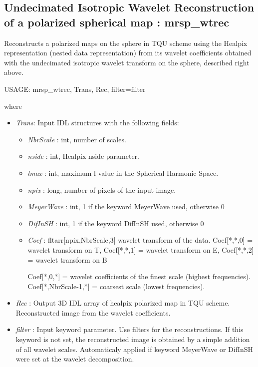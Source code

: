 \subsection{Undecimated Isotropic Wavelet Reconstruction of a polarized spherical map : mrsp\_wtrec}
Reconstructs a polarized maps on the sphere in TQU scheme using the Healpix representation (nested data representation) 
from its wavelet coefficients obtained with the undecimated isotropic wavelet transform on the sphere, described right above.
{\bf
\begin{center}
     USAGE: mrsp\_wtrec, Trans, Rec, filter=filter
\end{center}}
where
\begin{itemize}
\item {\em Trans}: Input IDL structures with the following fields:  
\begin{itemize}
\item {\em NbrScale} : int, number of scales.
\item {\em nside} : int, Healpix nside parameter.
\item {\em lmax} : int, maximum l value in the Spherical Harmonic Space.
\item {\em npix} : long, number of pixels of the input image.
\item {\em MeyerWave} : int, 1 if the keyword MeyerWave used, otherwise 0
\item {\em DifInSH} : int, 1 if the keyword DifInSH used, otherwise 0
\item {\em Coef} : fltarr[npix,NbrScale,3] wavelet transform of the data. Coef[*,*,0] = wavelet transform on T, Coef[*,*,1] = wavelet transform on E, Coef[*,*,2] = wavelet transform on B
\begin{center}
Coef[*,0,*] = wavelet coefficients of the finest scale (highest frequencies).\\
Coef[*,NbrScale-1,*] = coarsest scale (lowest frequencies). 
\end{center}
\end{itemize}
\item {\em Rec} : Output 3D IDL array of healpix polarized map in TQU scheme. Reconstructed image from the wavelet coefficients. 
\item {\em filter} : Input keyword parameter. Use filters for the reconstructions. If this keyword is not set, the reconstructed image is obtained 
by a simple addition of all wavelet scales. Automaticaly applied if keyword MeyerWave or DifInSH were set at the wavelet decomposition.
\end{itemize}

